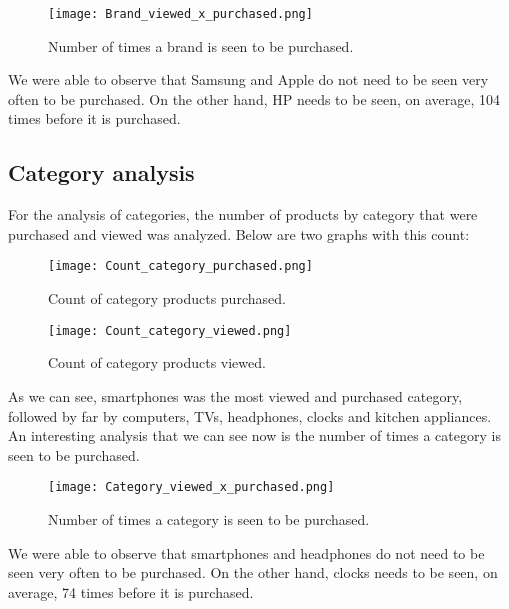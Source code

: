 \begin{figure}[H]
    \texttt{[image: Brand\_viewed\_x\_purchased.png]}
    \caption{Number of times a brand is seen to be purchased.}
\end{figure}

We were able to observe that Samsung and Apple do not need to be seen very often to be purchased.
On the other hand, HP needs to be seen, on average, 104 times before it is purchased.

\subsection{Category analysis}
For the analysis of categories, the number of products by category that were purchased and viewed was analyzed.
Below are two graphs with this count:

\begin{figure}[H]
    \texttt{[image: Count\_category\_purchased.png]}
    \caption{Count of category products purchased.}
\end{figure}

\begin{figure}[H]
    \texttt{[image: Count\_category\_viewed.png]}
    \caption{Count of category products viewed.}
\end{figure}

As we can see, smartphones was the most viewed and purchased category, followed by far by computers, TVs, headphones, clocks and kitchen appliances.
An interesting analysis that we can see now is the number of times a category is seen to be purchased.

\begin{figure}[H]
    \texttt{[image: Category\_viewed\_x\_purchased.png]}
    \caption{Number of times a category is seen to be purchased.}
\end{figure}

We were able to observe that smartphones and headphones do not need to be seen very often to be purchased.
On the other hand, clocks needs to be seen, on average, 74 times before it is purchased.

